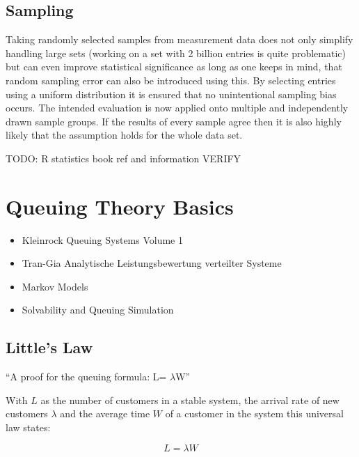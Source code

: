 \subsection{Sampling}
Taking randomly selected samples from measurement data does not only simplify handling large sets (working on a set with 2 billion entries is quite problematic) but can even improve statistical significance as long as one keeps in mind, that random sampling error can also be introduced using this.
By selecting entries using a uniform distribution it is ensured that no unintentional sampling bias occurs. The intended evaluation is now applied onto multiple and independently drawn sample groups. If the results of every sample agree then it is also highly likely that the assumption holds for the whole data set.

TODO: R statistics book ref and information VERIFY


\section{Queuing Theory Basics}

\begin{itemize}
\item Kleinrock Queuing Systems Volume 1 \cite{Kleinrock:1975:TVQ:1096491}
\item Tran-Gia Analytische Leistungsbewertung verteilter Systeme \cite{trangia-lbvs}
\item Markov Models 
\item Solvability and Queuing Simulation
\end{itemize}


\subsection{Little's Law}
``A proof for the queuing formula: L= $\lambda$W'' \cite{little1961proof}

With $L$  as the number of customers in a stable system, the arrival rate of new customers $\lambda$ and the average time $W$ of a customer in the system this universal law states:

\begin{equation}
L = \lambda W
\end{equation}

